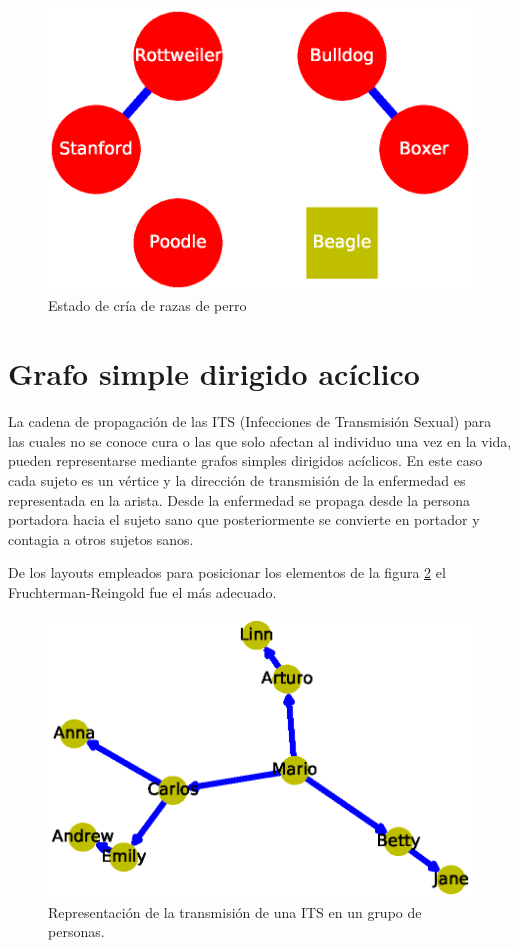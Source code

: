 \documentclass{article}
\begin{document}
\begin{figure}
  \includegraphics[width=.8\columnwidth]{fig3.eps}
  \caption{Estado de cría de razas de perro}
  \label{Figura 3}
\end{figure}



\section{Grafo simple dirigido acíclico}

La cadena de propagación de las ITS (Infecciones de Transmisión Sexual) para las cuales no se conoce cura o las que solo afectan al individuo una vez en la vida, pueden representarse mediante grafos simples dirigidos acíclicos. En este caso cada sujeto es un vértice y la dirección de transmisión de la enfermedad es representada en la arista. Desde la enfermedad se propaga desde la persona portadora hacia el sujeto sano que posteriormente se convierte en portador y contagia a otros sujetos sanos.

De los layouts empleados para posicionar los elementos de la figura \ref{Figura 4} el Fruchterman-Reingold fue el más adecuado.

\begin{figure}
  \includegraphics[width=.8\columnwidth]{fig4.eps}
  \caption{Representación de la transmisión de una ITS en un grupo de personas.}
  \label{Figura 4}
\end{figure}
\newpage

\end{document}
